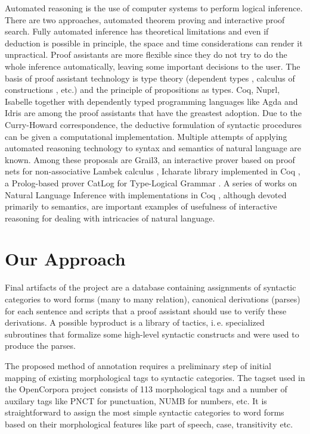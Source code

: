 \documentclass[a4paper]{article}
\theoremstyle{example-style}
\begin{document}
Automated reasoning is the use of computer systems to perform logical inference. There are two approaches, automated theorem proving and interactive proof search. Fully automated inference has theoretical limitations and even if deduction is possible in principle, the space and time considerations can render it unpractical. Proof assistants are more flexible since they do not try to do the whole inference automatically, leaving some important decisions to the user. The basis of proof assistant technology is type theory (dependent types \parencite{martin1984intuitionistic}, calculus of constructions \parencite{coquand1988calculus}, etc.) and the principle of propositions as types. Coq, Nuprl, Isabelle together with dependently typed programming languages like Agda and Idris are among the proof assistants that have the greastest adoption. Due to the Curry-Howard correspondence, the deductive formulation of syntactic procedures can be given a computational implementation. Multiple attempts of applying automated reasoning technology to syntax and semantics of natural language are known. Among these proposals are Grail3, an interactive prover based on proof nets for non-associative Lambek calculus \parencite{moot2002proof}, Icharate library implemented in Coq \parencite{anoun2007approche}, a Prolog-based prover CatLog for Type-Logical Grammar \parencite{morrill2012catlog}. A series of works on Natural Language Inference with implementations in Coq \parencite{chatzikyriakidis2014natural}, although devoted primarily to semantics, are important examples of usefulness of interactive reasoning for dealing with intricacies of natural language.


\section{Our Approach}

Final artifacts of the project are a database containing assignments of syntactic categories to word forms (many to many relation), canonical derivations (parses) for each sentence and scripts that a proof assistant should use to verify these derivations. A possible byproduct is a library of tactics, i.\,e. specialized subroutines that formalize some high-level syntactic constructs and were used to produce the parses. 

The proposed method of annotation requires a preliminary step of initial mapping of existing morphological tags to syntactic categories. The tagset used in the OpenCorpora project consists of 113 morphological tags and a number of auxilary tags like PNCT for punctuation, NUMB for numbers, etc. It is straightforward to assign the most simple syntactic categories to word forms based on their morphological features like part of speech, case, transitivity etc.
\end{document}
